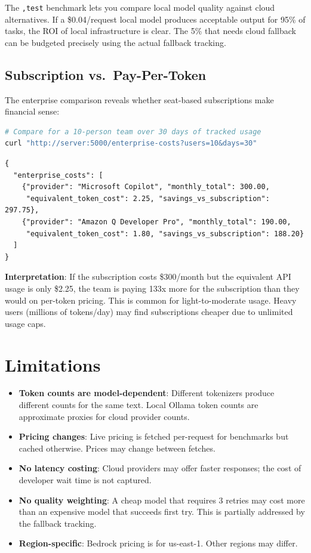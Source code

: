\documentclass[11pt,a4paper]{article}
\begin{document}
The \texttt{,test} benchmark lets you compare local model quality against cloud alternatives. If a \$0.04/request local model produces acceptable output for 95\% of tasks, the ROI of local infrastructure is clear. The 5\% that needs cloud fallback can be budgeted precisely using the actual fallback tracking.

\subsection{Subscription vs.\ Pay-Per-Token}

The enterprise comparison reveals whether seat-based subscriptions make financial sense:

\begin{lstlisting}[language=bash,caption={Enterprise cost comparison API}]
# Compare for a 10-person team over 30 days of tracked usage
curl "http://server:5000/enterprise-costs?users=10&days=30"
\end{lstlisting}

\begin{lstlisting}[language={}]
{
  "enterprise_costs": [
    {"provider": "Microsoft Copilot", "monthly_total": 300.00,
     "equivalent_token_cost": 2.25, "savings_vs_subscription": 297.75},
    {"provider": "Amazon Q Developer Pro", "monthly_total": 190.00,
     "equivalent_token_cost": 1.80, "savings_vs_subscription": 188.20}
  ]
}
\end{lstlisting}

\textbf{Interpretation}: If the subscription costs \$300/month but the equivalent API usage is only \$2.25, the team is paying 133x more for the subscription than they would on per-token pricing. This is common for light-to-moderate usage. Heavy users (millions of tokens/day) may find subscriptions cheaper due to unlimited usage caps.

\section{Limitations}

\begin{itemize}
  \item \textbf{Token counts are model-dependent}: Different tokenizers produce different counts for the same text. Local Ollama token counts are approximate proxies for cloud provider counts.
  \item \textbf{Pricing changes}: Live pricing is fetched per-request for benchmarks but cached otherwise. Prices may change between fetches.
  \item \textbf{No latency costing}: Cloud providers may offer faster responses; the cost of developer wait time is not captured.
  \item \textbf{No quality weighting}: A cheap model that requires 3 retries may cost more than an expensive model that succeeds first try. This is partially addressed by the fallback tracking.
  \item \textbf{Region-specific}: Bedrock pricing is for us-east-1. Other regions may differ.
\end{itemize}
\end{document}
